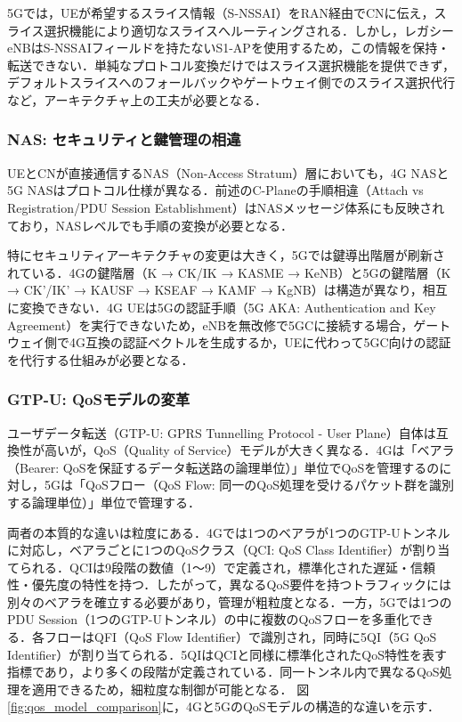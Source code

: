 5Gでは，UEが希望するスライス情報（S-NSSAI）をRAN経由でCNに伝え，スライス選択機能により適切なスライスへルーティングされる．しかし，レガシーeNBはS-NSSAIフィールドを持たないS1-APを使用するため，この情報を保持・転送できない．単純なプロトコル変換だけではスライス選択機能を提供できず，デフォルトスライスへのフォールバックやゲートウェイ側でのスライス選択代行など，アーキテクチャ上の工夫が必要となる．

\subsubsection{NAS: セキュリティと鍵管理の相違}
UEとCNが直接通信するNAS（Non-Access Stratum）層においても，4G NAS\cite{3GPP_TS24301}と5G NAS\cite{3GPP_TS24501}はプロトコル仕様が異なる．前述のC-Planeの手順相違（Attach vs Registration/PDU Session Establishment）はNASメッセージ体系にも反映されており，NASレベルでも手順の変換が必要となる．

特にセキュリティアーキテクチャの変更は大きく，5Gでは鍵導出階層が刷新されている．4Gの鍵階層（K → CK/IK → KASME → KeNB）\cite{3GPP_TS33401}と5Gの鍵階層（K → CK'/IK' → KAUSF → KSEAF → KAMF → KgNB）\cite{3GPP_TS33501}は構造が異なり，相互に変換できない．4G UEは5Gの認証手順（5G AKA: Authentication and Key Agreement）を実行できないため，eNBを無改修で5GCに接続する場合，ゲートウェイ側で4G互換の認証ベクトルを生成するか，UEに代わって5GC向けの認証を代行する仕組みが必要となる．

\subsubsection{GTP-U: QoSモデルの変革}
ユーザデータ転送（GTP-U: GPRS Tunnelling Protocol - User Plane）\cite{3GPP_TS29281}自体は互換性が高いが，QoS（Quality of Service）モデルが大きく異なる．4Gは「ベアラ（Bearer: QoSを保証するデータ転送路の論理単位）」単位でQoSを管理するのに対し，5Gは「QoSフロー（QoS Flow: 同一のQoS処理を受けるパケット群を識別する論理単位）」単位で管理する．

両者の本質的な違いは粒度にある．4Gでは1つのベアラが1つのGTP-Uトンネルに対応し，ベアラごとに1つのQoSクラス（QCI: QoS Class Identifier）が割り当てられる．QCIは9段階の数値（1〜9）で定義され，標準化された遅延・信頼性・優先度の特性を持つ．したがって，異なるQoS要件を持つトラフィックには別々のベアラを確立する必要があり，管理が粗粒度となる．一方，5Gでは1つのPDU Session（1つのGTP-Uトンネル）の中に複数のQoSフローを多重化できる．各フローはQFI（QoS Flow Identifier）で識別され，同時に5QI（5G QoS Identifier）が割り当てられる．5QIはQCIと同様に標準化されたQoS特性を表す指標であり，より多くの段階が定義されている．同一トンネル内で異なるQoS処理を適用できるため，細粒度な制御が可能となる．
図\ref{fig:qos_model_comparison}に，4Gと5GのQoSモデルの構造的な違いを示す．

